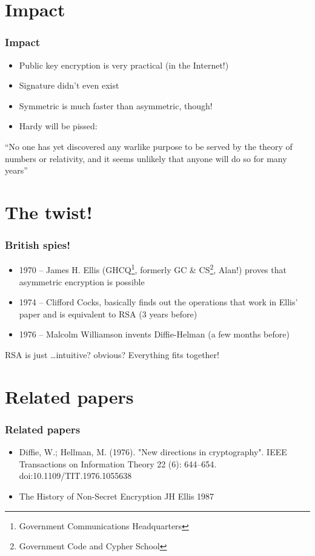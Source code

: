 \documentclass{beamer}
\begin{document}
\section{Impact}

\begin{frame}
	\frametitle{Impact}

	\begin{itemize}
		\item Public key encryption is very practical (in the
		      Internet!)
		\item Signature didn't even exist
		\item Symmetric is much faster than asymmetric, though!
		\item Hardy will be pissed:
	\end{itemize}

	\begin{exampleblock}{}
		``No one has yet discovered any warlike purpose to be served
		by the theory of numbers or relativity, and it seems
		unlikely that anyone will do so for many years''
	\end{exampleblock}
\end{frame}

\section{The twist!}

\begin{frame}
	\frametitle{British spies!}

	\begin{itemize}
		\item 1970 -- James H. Ellis (GHCQ\footnote{Government
		      Communications Headquarters}, formerly GC \&
		      CS\footnote{Government Code and Cypher School}, Alan!)
		      proves that asymmetric encryption is possible
		\item 1974 -- Clifford Cocks, basically finds out the
		      operations that work in Ellis' paper and is equivalent
		      to RSA (3 years before)
		\item 1976 -- Malcolm Williamson invents Diffie-Helman (a
		      few months before)
	\end{itemize}

	RSA is just \ldots intuitive? obvious? Everything fits together!
\end{frame}

\section{Related papers}

\begin{frame}
	\frametitle{Related papers}

	\begin{itemize}
		\item Diffie, W.; Hellman, M. (1976). "New directions in
		      cryptography". IEEE Transactions on Information Theory 22 
		      (6): 644–654. doi:10.1109/TIT.1976.1055638
		\item The History of Non-Secret Encryption JH Ellis 1987
	\end{itemize}
\end{frame}
\end{document}
